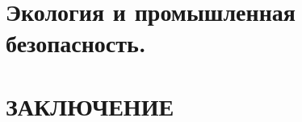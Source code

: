 \documentclass[a4paper,12pt]{article}
\begin{document}
    \section{Экология и промышленная безопасность.}

    \section{ЗАКЛЮЧЕНИЕ}

    \newpage
    \begin{thebibliography}{40}










\end{thebibliography}
\end{document}
